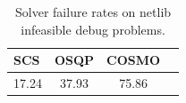 \begin{table}
\centering
\caption{Solver failure rates on netlib infeasible debug problems.}
\label{t-netlib infeasible debug-failure}
\begin{tabular}{lccc}
\toprule
  SCS &  OSQP &  COSMO \\
\midrule
17.24 & 37.93 &  75.86 \\
\bottomrule
\end{tabular}
\end{table}
